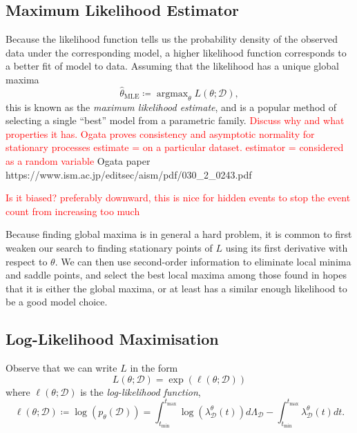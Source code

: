 \documentclass[honours,12pt]{unswthesis}
\DeclareMathOperator*{\argmax}{argmax}
\numberwithin{equation}{section}
\begin{document}
\subsection{Maximum Likelihood Estimator}
Because the likelihood function tells us the probability density of the observed data under the corresponding model, a higher likelihood function corresponds to a better fit of model to data. Assuming that the likelihood has a unique global maxima
$$\hat\theta_\mathrm{MLE} \coloneq \argmax_\theta L(\theta;\mathcal{D}),$$
this is known as the \textit{maximum likelihood estimate}, and is a popular method of selecting a single ``best'' model from a parametric family.
\textcolor{red}{Discuss why and what properties it has. Ogata proves consistency and asymptotic normality for stationary processes}
\textcolor{red}{estimate = on a particular dataset. estimator = considered as a random variable}
Ogata paper https://www.ism.ac.jp/editsec/aism/pdf/030_2_0243.pdf 

\textcolor{red}{Is it biased? preferably downward, this is nice for hidden events to stop the event count from increasing too much}

Because finding global maxima is in general a hard problem, it is common to first weaken our search to finding stationary points of $L$ using its first derivative with respect to $\theta$. We can then use second-order information to eliminate local minima and saddle points, and select the best local maxima among those found in hopes that it is either the global maxima, or at least has a similar enough likelihood to be a good model choice.

\subsection{Log-Likelihood Maximisation}

Observe that we can write $L$ in the form
$$L(\theta;\mathcal{D}) = \exp(\ell(\theta;\mathcal{D}))$$
where $\ell(\theta;\mathcal{D})$ is the \textit{log-likelihood function},
$$\ell(\theta ; \mathcal{D}) \coloneq \log(p_\theta(\mathcal{D})) = \int_{t_\mathrm{min}}^{t_\mathrm{max}}\log(\lambda_\mathcal{D}^\theta(t))d\Lambda_\mathcal{D}-\int_{t_\mathrm{min}}^{t_\mathrm{max}}\lambda_\mathcal{D}^\theta(t) dt.$$
\end{document}

